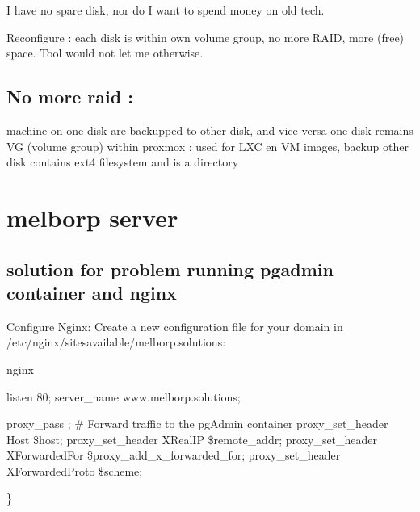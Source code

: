 \documentclass[letterpaper,10pt,english]{sphinxmanual}
\begin{document}
\sphinxAtStartPar
I have no spare disk, nor do I want to spend money on old tech.

\sphinxAtStartPar
Reconfigure : each disk is within own volume group, no more RAID, more (free) space.
Tool would not let me otherwise.


\section{No more raid :}
\label{\detokenize{raid:no-more-raid}}
\sphinxAtStartPar
machine on one disk are backupped to other disk, and vice versa
one disk remains VG (volume group) within proxmox : used for LXC en VM images, backup
other disk contains ext4 filesystem and is a directory

\sphinxstepscope


\chapter{melborp server}
\label{\detokenize{melborp:melborp-server}}\label{\detokenize{melborp::doc}}

\section{solution for problem running pgadmin container and nginx}
\label{\detokenize{melborp:solution-for-problem-running-pgadmin-container-and-nginx}}
\sphinxAtStartPar
Configure Nginx: Create a new configuration file for your domain in /etc/nginx/sites\sphinxhyphen{}available/melborp.solutions:

\sphinxAtStartPar
nginx
\begin{description}
\sphinxAtStartPar
listen 80;
server\_name www.melborp.solutions;
\begin{description}
\sphinxAtStartPar
proxy\_pass ;  \# Forward traffic to the pgAdmin container
proxy\_set\_header Host \$host;
proxy\_set\_header X\sphinxhyphen{}Real\sphinxhyphen{}IP \$remote\_addr;
proxy\_set\_header X\sphinxhyphen{}Forwarded\sphinxhyphen{}For \$proxy\_add\_x\_forwarded\_for;
proxy\_set\_header X\sphinxhyphen{}Forwarded\sphinxhyphen{}Proto \$scheme;

\end{description}

\sphinxAtStartPar
\}

\end{description}
\end{document}
